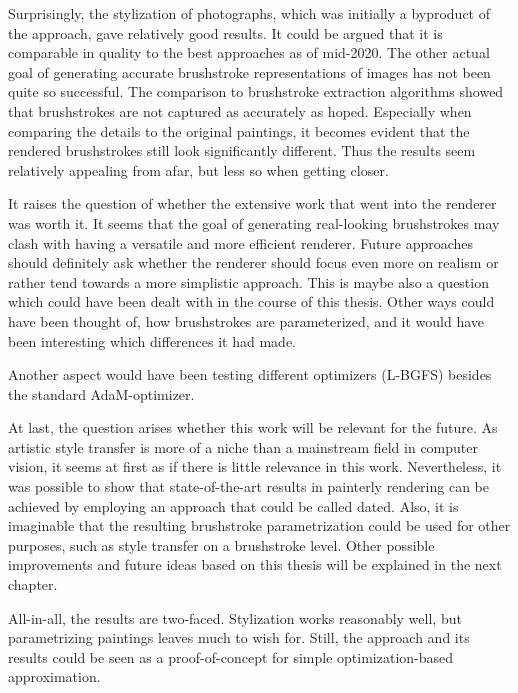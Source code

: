 Surprisingly, the stylization of photographs, which was initially a byproduct of the approach, gave relatively good results.
It could be argued that it is comparable in quality to the best approaches as of mid-2020.
The other actual goal of generating accurate brushstroke representations of images has not been quite so successful.
The comparison to brushstroke extraction algorithms showed that brushstrokes are not captured as accurately as hoped.
Especially when comparing the details to the original paintings, it becomes evident that the rendered brushstrokes still look significantly different.
Thus the results seem relatively appealing from afar, but less so when getting closer.

It raises the question of whether the extensive work that went into the renderer was worth it.
It seems that the goal of generating real-looking brushstrokes may clash with having a versatile and more efficient renderer.
Future approaches should definitely ask whether the renderer should focus even more on realism or rather tend towards a more simplistic approach. 
This is maybe also a question which could have been dealt with in the course of this thesis.
Other ways could have been thought of, how brushstrokes are parameterized, and it would have been interesting which differences it had made.

Another aspect would have been testing different optimizers (\eg L-BGFS) besides the standard AdaM-optimizer.

At last, the question arises whether this work will be relevant for the future.
As artistic style transfer is more of a niche than a mainstream field in computer vision, it seems at first as if there is little relevance in this work.
Nevertheless, it was possible to show that state-of-the-art results in painterly rendering can be achieved by employing an approach that could be called dated.
Also, it is imaginable that the resulting brushstroke parametrization could be used for other purposes, such as style transfer on a brushstroke level.
Other possible improvements and future ideas based on this thesis will be explained in the next chapter.

All-in-all, the results are two-faced.
Stylization works reasonably well, but parametrizing paintings leaves much to wish for.
Still, the approach and its results could be seen as a proof-of-concept for simple optimization-based approximation.

